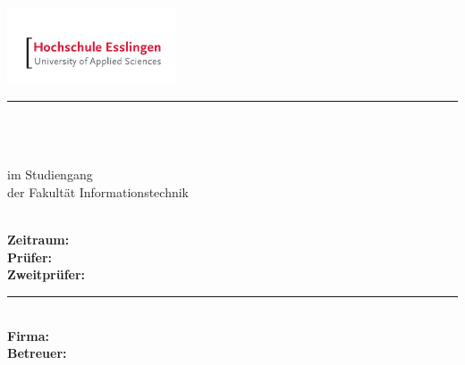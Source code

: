 \newcommand{\HRule}[2]{\noindent\rule[#1]{\linewidth}{#2}} %
\newcommand{\vlinespace}[1]{\vspace*{#1\baselineskip}} %
\newcommand{\titleemph}[1]{\textbf{#1}} %

\begin{titlepage}
 \sffamily %
      \hfill \includegraphics[width=5cm]{fig/aa-titel/HE_Logo_4c}
      \HRule{13pt}{2pt} 
   \centering
      \Large
      \vlinespace{3}\\
      \workTyp\\
      \huge
      \workTitel\\
%
      \Large
      \vlinespace{2}
          im Studiengang \workStudiengang\\
          der Fakultät Informationstechnik\\
%      
      \workSemester\\
%     
      \vlinespace{2}
      \workNameStudent
%
   \vfill
   \raggedright
%   
   \large
   \titleemph{Zeitraum:} \workZeitraum \\ %
   \titleemph{Prüfer:} \workPruefer \\
   \titleemph{Zweitprüfer:} \workZweitPruefer \\ %

   \vlinespace{1}
   \HRule{10pt}{2pt} \\
   \titleemph{Firma:} \workFirma \hfill \workFirmenLogo \\
   \titleemph{Betreuer:} \workBetreuer 
%
\end{titlepage}

